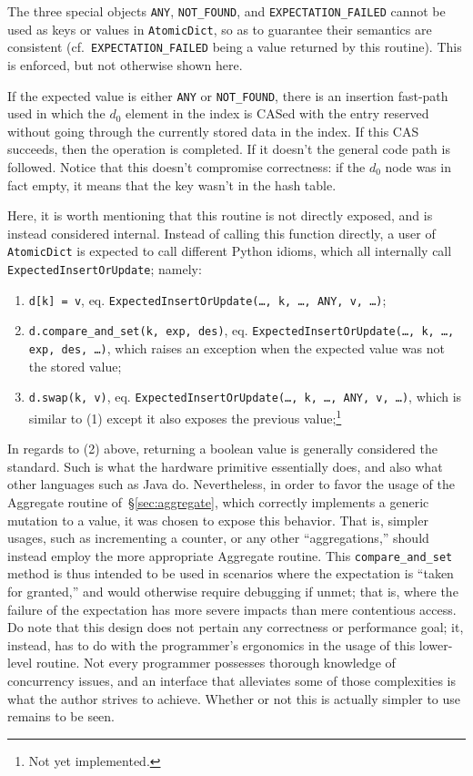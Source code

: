 The three special objects \texttt{{ANY}}, \texttt{{NOT\_FOUND}}, and \texttt{{EXPECTATION\_FAILED}} cannot be used as keys or values in \texttt{AtomicDict}, so as to guarantee their semantics are consistent (cf.\texttt{\ {EXPECTATION\_FAILED}} being a value returned by this routine).
This is enforced, but not otherwise shown here.

If the expected value is either \texttt{{ANY}} or \texttt{{NOT\_FOUND}}, there is an insertion fast-path used in which the $d_0$ element in the index is CASed with the entry reserved without going through the currently stored data in the index.
If this CAS succeeds, then the operation is completed.
If it doesn't the general code path is followed.
Notice that this doesn't compromise correctness: if the $d_0$ node was in fact empty, it means that the key wasn't in the hash table.

Here, it is worth mentioning that this routine is not directly exposed, and is instead considered internal.
Instead of calling this function directly, a user of \texttt{AtomicDict} is expected to call different Python idioms, which all internally call \texttt{ExpectedInsertOrUpdate}; namely:

\begin{enumerate}
	\item \texttt{{d[k] = v}}, eq. \texttt{{ExpectedInsertOrUpdate(\ldots, k, \ldots, ANY, v, \ldots)}};
	\item \texttt{{d.compare\_and\_set(k, exp, des)}}, eq. \texttt{{ExpectedInsertOrUpdate(\ldots, k, \ldots, exp, des, \ldots)}}, which raises an exception when the expected value was not the stored value;
	\item \texttt{{d.swap(k, v)}}, eq. \texttt{{ExpectedInsertOrUpdate(\ldots, k, \ldots, ANY, v, \ldots)}}, which is similar to (1) except it also exposes the previous value;\footnote{Not yet implemented.}
\end{enumerate}

In regards to (2) above, returning a boolean value is generally considered the standard.
Such is what the hardware primitive essentially does, and also what other languages such as Java do.
Nevertheless, in order to favor the usage of the Aggregate routine of~\S\ref{sec:aggregate}, which correctly implements a generic mutation to a value, it was chosen to expose this behavior.
That is, simpler usages, such as incrementing a counter, or any other ``aggregations,'' should instead employ the more appropriate Aggregate routine.
This \texttt{compare\_and\_set} method is thus intended to be used in scenarios where the expectation is ``taken for granted,'' and would otherwise require debugging if unmet; that is, where the failure of the expectation has more severe impacts than mere contentious access.
Do note that this design does not pertain any correctness or performance goal; it, instead, has to do with the programmer's ergonomics in the usage of this lower-level routine.
Not every programmer possesses thorough knowledge of concurrency issues, and an interface that alleviates some of those complexities is what the author strives to achieve.
Whether or not this is actually simpler to use remains to be seen.

